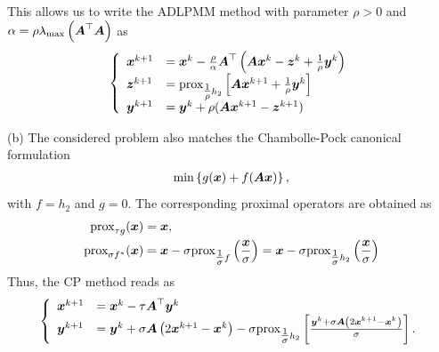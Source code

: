 This allows us to write the ADLPMM method with parameter $\rho>0$ and $\alpha = \rho \lambda_{\text{max}}\left(\boldsymbol A^\top \boldsymbol A\right)$ as 
      \begin{align*}
    \begin{split}
    \left\{
    \begin{array}{ll}
         \boldsymbol x^{k+1} &= \boldsymbol x^k - \frac{\rho}{\alpha} \boldsymbol A^\top \left(\boldsymbol A\boldsymbol x^k-\boldsymbol z^k + {\textstyle\frac{1}{\rho}} \boldsymbol y^k\right)\\
        \boldsymbol z^{k+1} &= \text{prox}_{{\textstyle\frac{1}{\rho}} h_2}\left[\boldsymbol A \boldsymbol x^{k+1} + {\textstyle\frac{1}{\rho}} \boldsymbol y^k \right]\\
        \boldsymbol y^{k+1} &= \boldsymbol y^{k} + \rho (\boldsymbol A \boldsymbol x^{k+1}- \boldsymbol z^{k+1})
    \end{array}
    \right.
    \end{split}
    \end{align*}
    
    \indent (b) The considered problem also matches the Chambolle-Pock canonical formulation 
    \begin{align*}
	\min \left\{g(\boldsymbol x) +f(\boldsymbol A\boldsymbol x)  \right\},
\end{align*}
with $f = h_2$ and $g=0$. The corresponding proximal operators are obtained as 
\begin{align*}
	\text{prox}_{\tau g}(\boldsymbol x) &= \boldsymbol x,\\
	\text{prox}_{\sigma f^*}(\boldsymbol x) &= \boldsymbol x - \sigma \text{prox}_{{\textstyle\frac{1}{\sigma}} f}\left(\frac{\boldsymbol x}{\sigma}\right) = \boldsymbol x - \sigma \text{prox}_{{\textstyle\frac{1}{\sigma}} h_2}\left(\frac{\boldsymbol x}{\sigma}\right)
\end{align*}
Thus, the CP method reads as 
          \begin{align*}
    \begin{split}
    \left\{
    \begin{array}{ll}
         \boldsymbol x^{k+1} &= \boldsymbol x^k - \tau\boldsymbol A^\top \boldsymbol y^k\\
        \boldsymbol y^{k+1} &= \boldsymbol y^k + \sigma \boldsymbol A\left(2\boldsymbol x^{k+1}-\boldsymbol x^k\right)- \sigma \text{prox}_{{\textstyle\frac{1}{\sigma}} h_2}\left[\frac{\boldsymbol y^k + \sigma \boldsymbol A\left(2\boldsymbol x^{k+1}-\boldsymbol x^k\right)}{\sigma} \right].
    \end{array}
    \right.
    \end{split}
    \end{align*}
    
